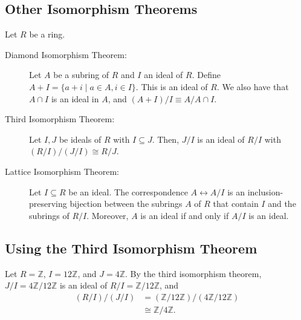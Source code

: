 \documentclass[10pt]{extarticle}
\newcommand{\Z}{\mathbb{Z}}
\begin{document}
  \subsection{Other Isomorphism Theorems}%
  Let $R$ be a ring.
  \begin{description}
    \item[Diamond Isomorphism Theorem:] Let $A$ be a subring of $R$ and $I$ an ideal of $R$. Define $A + I = \{a+i\mid a\in A,i\in I\}$. This is an ideal of $R$. We also have that $A\cap I$ is an ideal in $A$, and $(A+I)/I \equiv A/A\cap I$.
  \end{description}
  \begin{center}
  \end{center}
  \begin{description}
    \item[Third Isomorphism Theorem:] Let $I,J$ be ideals of $R$ with $I\subseteq J$. Then, $J/I$ is an ideal of $R/I$ with $(R/I)/(J/I)\cong R/J$.
    \item[Lattice Isomorphism Theorem:] Let $I\subseteq R$ be an ideal. The correspondence $A\leftrightarrow A/I$ is an inclusion-preserving bijection between the subrings $A$ of $R$ that contain $I$ and the subrings of $R/I$. Moreover, $A$ is an ideal if and only if $A/I$ is an ideal.
  \end{description}
  \subsection{Using the Third Isomorphism Theorem}%
  Let $R = \Z$, $I = 12\Z$, and $J = 4\Z$. By the third isomorphism theorem, $J/I = 4\Z/12\Z$ is an ideal of $R/I = \Z/12\Z$, and
  \begin{align*}
    (R/I)/(J/I) &= (\Z/12\Z)/(4\Z/12\Z)\\
                &\cong \Z/4\Z.
  \end{align*}
\end{document}
